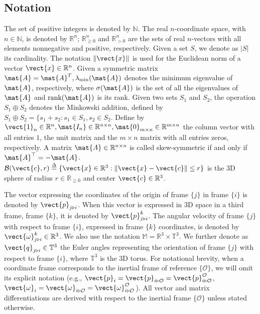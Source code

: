 \subsection{Notation}

The set of positive integers is denoted by $\mathbb{N}$. The real $n$-coordinate
space, with $n\in\mathbb{N}$, is denoted by $\mathbb{R}^n$;
$\mathbb{R}^n_{\geq 0}$ and $\mathbb{R}^n_{> 0}$ are the sets of real
$n$-vectors with all elements nonnegative and positive, respectively. Given a
set $S$, we denote as $\lvert S\lvert$ its cardinality. The notation
$\|\vect{x}\|$ is used for the Euclidean norm of a vector
$\vect{x} \in \mathbb{R}^n$. Given a symmetric matrix
$\mat{A} = \mat{A}^T, \lambda_{\text{min}}(\mat{A})$
denotes the minimum eigenvalue of $\mat{A}$, respectively, where
$\sigma(\mat{A})$ is the set of all the eigenvalues of
$\mat{A}$ and $\text{rank}(\mat{A})$ is its rank. Given two sets $S_1$ and $S_2$,
the operation $S_1 \oplus S_2$ denotes the Minkowski addition, defined by
$S_1 \oplus S_2 = \{s_1 + s_2 : s_1 \in S_1, s_2 \in S_2$. Define by
$\vect{1}_n \in \mathbb{R}^n, \mat{I_n} \in \mathbb{R}^{n \times n},
\mat{0}_{m \times n} \in \mathbb{R}^{m \times n}$
the column vector with all entries $1$, the unit matrix and the $m \times n$
matrix with all entries zeros, respectively.
A matrix $\mat{A} \in \mathbb{R}^{n \times n}$ is called skew-symmetric if and only
if $\mat{A}^\top = -\mat{A}$.
$\mathcal{B}(\vect{c},r) \overset{\Delta}{=} \{\vect{x} \in \mathbb{R}^3: \|\vect{x}-\vect{c}\| \leq r\}$
is the $3$D sphere of radius $r \in \mathbb{R}_{\ge 0}$ and center
$\vect{c}\in\mathbb{R}^{3}$.

The vector expressing the coordinates of the origin of frame $\{j\}$ in
frame $\{i\}$ is denoted by $\vect{p}_{j \triangleright i}$. When this vector is
expressed in 3D space in a third frame, frame $\{k\}$, it is denoted by
$\vect{p}_{j \triangleright i}^{k}$.
The angular velocity of frame $\{j\}$ with respect to frame $\{i\}$, expressed
in frame $\{k\}$ coordinates, is denoted by
$\vect{\omega}^k_{j \triangleright i}\in \mathbb{R}^{3}$.
We also use the notation $\mathbb{M} = \mathbb{R}^3\times \mathbb{T}^3$.
We further denote as $\vect{q}_{j \triangleright i} \in \mathbb{T}^3$
the Euler angles representing the orientation of frame $\{j\}$ with respect to
frame $\{i\}$, where $\mathbb{T}^3$ is the $3$D torus.
For notational brevity, when a coordinate frame corresponds to the inertial frame
of reference $\{\mathcal{O}\}$, we will omit its explicit notation
(e.g., $\vect{p}_i = \vect{p}_{i \triangleright \mathcal{O}} = \vect{p}^\mathcal{O}_{i \triangleright \mathcal{O}}$,
$\vect{\omega}_i = \vect{\omega}_{i \triangleright \mathcal{O}} = \vect{\omega}^\mathcal{O}_{i \triangleright \mathcal{O}}$).
All vector and matrix differentiations are derived with respect to the inertial
frame $\{\mathcal{O}\}$ unless stated otherwise.

